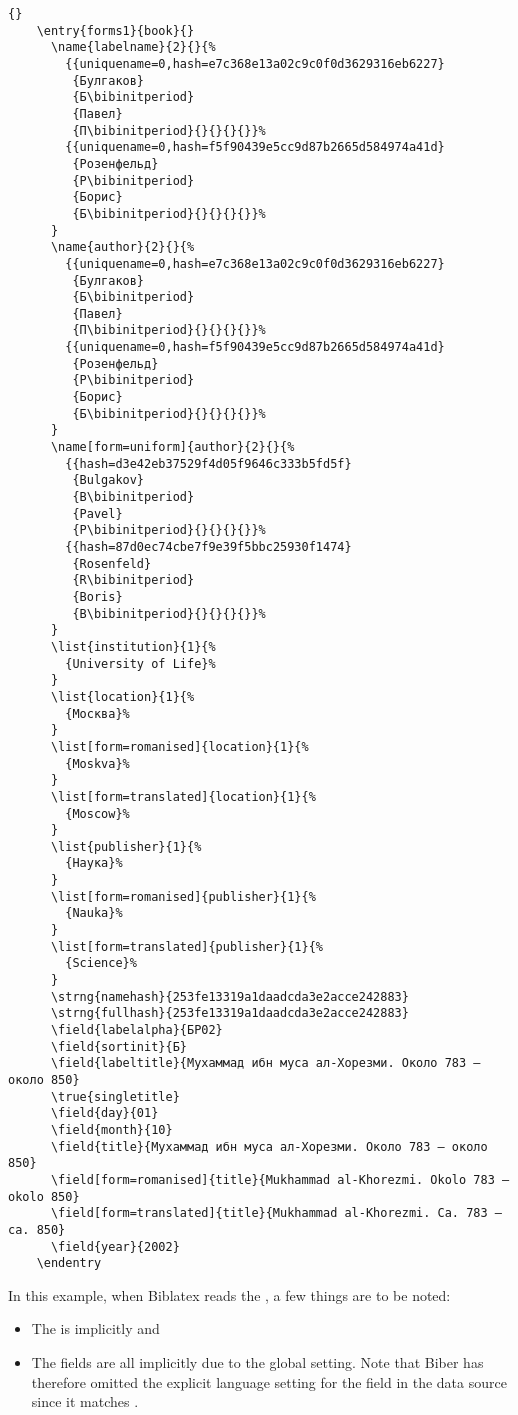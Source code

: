 \documentclass{ltxdockit}[2011/03/25]
\newcommand*{\biber}{Biber\xspace}
\newcommand*{\biblatex}{Biblatex\xspace}
\begin{document}
\begin{lstlisting}[style=latex]{}
    \entry{forms1}{book}{}
      \name{labelname}{2}{}{%
        {{uniquename=0,hash=e7c368e13a02c9c0f0d3629316eb6227}
         {Булгаков}
         {Б\bibinitperiod}
         {Павел}
         {П\bibinitperiod}{}{}{}{}}%
        {{uniquename=0,hash=f5f90439e5cc9d87b2665d584974a41d}
         {Розенфельд}
         {Р\bibinitperiod}
         {Борис}
         {Б\bibinitperiod}{}{}{}{}}%
      }
      \name{author}{2}{}{%
        {{uniquename=0,hash=e7c368e13a02c9c0f0d3629316eb6227}
         {Булгаков}
         {Б\bibinitperiod}
         {Павел}
         {П\bibinitperiod}{}{}{}{}}%
        {{uniquename=0,hash=f5f90439e5cc9d87b2665d584974a41d}
         {Розенфельд}
         {Р\bibinitperiod}
         {Борис}
         {Б\bibinitperiod}{}{}{}{}}%
      }
      \name[form=uniform]{author}{2}{}{%
        {{hash=d3e42eb37529f4d05f9646c333b5fd5f}
         {Bulgakov}
         {B\bibinitperiod}
         {Pavel}
         {P\bibinitperiod}{}{}{}{}}%
        {{hash=87d0ec74cbe7f9e39f5bbc25930f1474}
         {Rosenfeld}
         {R\bibinitperiod}
         {Boris}
         {B\bibinitperiod}{}{}{}{}}%
      }
      \list{institution}{1}{%
        {University of Life}%
      }
      \list{location}{1}{%
        {Москва}%
      }
      \list[form=romanised]{location}{1}{%
        {Moskva}%
      }
      \list[form=translated]{location}{1}{%
        {Moscow}%
      }
      \list{publisher}{1}{%
        {Наука}%
      }
      \list[form=romanised]{publisher}{1}{%
        {Nauka}%
      }
      \list[form=translated]{publisher}{1}{%
        {Science}%
      }
      \strng{namehash}{253fe13319a1daadcda3e2acce242883}
      \strng{fullhash}{253fe13319a1daadcda3e2acce242883}
      \field{labelalpha}{БР02}
      \field{sortinit}{Б}
      \field{labeltitle}{Мухаммад ибн муса ал-Хорезми. Около 783 – около 850}
      \true{singletitle}
      \field{day}{01}
      \field{month}{10}
      \field{title}{Мухаммад ибн муса ал-Хорезми. Около 783 – около 850}
      \field[form=romanised]{title}{Mukhammad al-Khorezmi. Okolo 783 – okolo 850}
      \field[form=translated]{title}{Mukhammad al-Khorezmi. Ca. 783 – ca. 850}
      \field{year}{2002}
    \endentry
\end{lstlisting}
%
In this example, when \biblatex reads the , a few things are to be noted:

\begin{itemize}
\setlength{\itemsep}{0pt}
\item The  is implicitly  and 
\item The  fields are all implicitly  due to the global  setting. Note that \biber has therefore omitted the explicit language setting for the  field in the data source since it matches .
\end{itemize}
\end{document}

